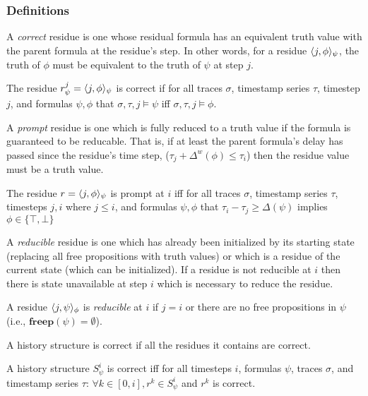\subsubsection{Definitions}

A \emph{correct} residue is one whose residual formula has an equivalent truth value with the parent formula at the residue's step. In other words, for a residue $\langle j, \phi \rangle_{\psi}$, the truth of $\phi$ must be equivalent to the truth of $\psi$ at step $j$.
\begin{definition} The residue $r^j_{\psi} = \langle j, \phi \rangle_{\psi}$ is correct if for all traces $\sigma$, timestamp series $\tau$, timestep $j$, and formulas $\psi, \phi$ that $\sigma, \tau, j \vDash \psi$ iff $\sigma, \tau, j \vDash \phi$.
\end{definition}

A \emph{prompt} residue is one which is fully reduced to a truth value if the formula is guaranteed to be reducable. That is, if at least the parent formula's delay has passed since the residue's time step, ($\tau_j+\Delta^{w}(\phi) \leq \tau_i$) then the residue value must be a truth value.
\begin{definition} The residue $r = \langle j, \phi \rangle_{\psi}$ is prompt at $i$ iff for all traces $\sigma$, timestamp series $\tau$, timesteps $j,i$ where $j \leq i$, and formulas $\psi, \phi$ that $\tau_i-\tau_j \geq \Delta(\psi)$ implies $\phi \in \{\top,\bot\}$
\end{definition}

A \emph{reducible} residue is one which has already been initialized by its starting state (replacing all free propositions with truth values) or which is a residue of the current state (which can be initialized). If a residue is not reducible at $i$ then there is state unavailable at step $i$ which is necessary to reduce the residue.
\begin{definition}
A residue $\langle j, \psi \rangle_{\phi}$ is \emph{reducible} at $i$ if $j=i$ or there are no free propositions in $\psi$ (i.e., $\mathbf{freep}(\psi) = \emptyset$). 
\end{definition}

A history structure is correct if all the residues it contains are correct.
\begin{definition} A history structure $S^i_{\psi}$ is correct iff for all timesteps $i$, formulas $\psi$, traces $\sigma$, and timestamp series $\tau$: 
 $\forall k \in [0,i], r^k \in S^i_{\psi}$ and $r^k$ is correct. %
\end{definition}

